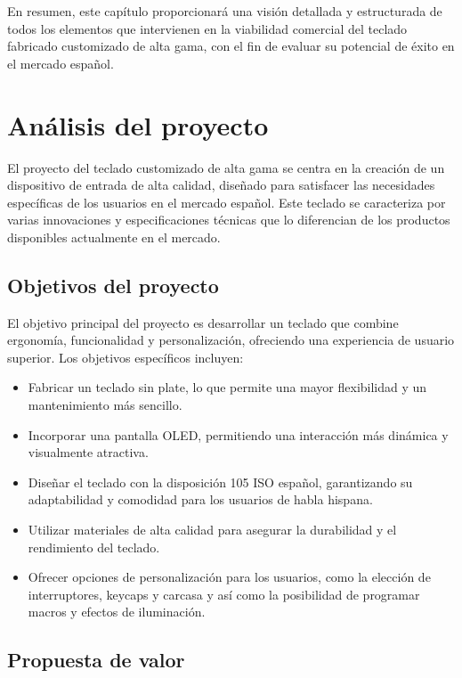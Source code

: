 En resumen, este capítulo proporcionará una visión detallada y estructurada de todos los elementos que intervienen en la viabilidad comercial del teclado fabricado customizado de alta gama, con el fin de evaluar su potencial de éxito en el mercado español.

\section{Análisis del proyecto}

El proyecto del teclado customizado de alta gama se centra en la creación de un dispositivo de entrada de alta calidad, diseñado para satisfacer las necesidades específicas de los usuarios en el mercado español. Este teclado se caracteriza por varias innovaciones y especificaciones técnicas que lo diferencian de los productos disponibles actualmente en el mercado.

\subsection{Objetivos del proyecto}

El objetivo principal del proyecto es desarrollar un teclado que combine ergonomía, funcionalidad y personalización, ofreciendo una experiencia de usuario superior. Los objetivos específicos incluyen:

\begin{itemize}
    \item Fabricar un teclado sin plate, lo que permite una mayor flexibilidad y un mantenimiento más sencillo.
    \item Incorporar una pantalla OLED, permitiendo una interacción más dinámica y visualmente atractiva.
    \item Diseñar el teclado con la disposición 105 ISO español, garantizando su adaptabilidad y comodidad para los usuarios de habla hispana.
    \item Utilizar materiales de alta calidad para asegurar la durabilidad y el rendimiento del teclado.
    \item Ofrecer opciones de personalización para los usuarios, como la elección de interruptores, keycaps y carcasa y así como la posibilidad de programar macros y efectos de iluminación.
\end{itemize}

\subsection{Propuesta de valor}

